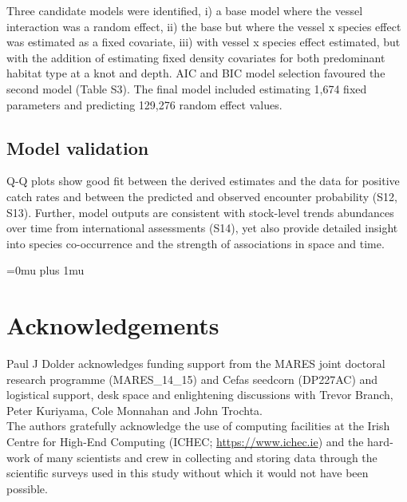 \documentclass[fleqn,10pt]{wlscirep}
\begin{document}
\begin{linenumbers}
Three candidate models were identified, i) a base model where the vessel
interaction was a random effect, ii) the base but where the vessel x species
effect was estimated as a fixed covariate, iii) with vessel x species effect
estimated, but with the addition of estimating fixed density covariates for
both predominant habitat type at a knot and depth. AIC and BIC model selection
favoured the second model (Table S3). The final model included estimating 1,674
fixed parameters and predicting 129,276 random effect values.\\

\subsection*{Model validation\\}

Q-Q plots show good fit between the derived estimates and the data for positive
catch rates and between the predicted and observed encounter probability (S12,
S13).  Further, model outputs are consistent with stock-level trends abundances
over time from international assessments (S14), yet also provide detailed
insight into species co-occurrence and the strength of associations in space
and time. \\

\end{linenumbers}
\newpage
\Urlmuskip=0mu plus 1mu\relax
%



\newpage



\section*{Acknowledgements} 
Paul J Dolder acknowledges funding support from the MARES joint doctoral
research programme (MARES\_14\_15) and Cefas seedcorn (DP227AC) and logistical
support, desk space and enlightening discussions with Trevor Branch, Peter
Kuriyama, Cole Monnahan and John Trochta.\\
	 
The authors gratefully acknowledge the use of computing facilities at the Irish
Centre for High-End Computing (ICHEC; \url{https://www.ichec.ie}) and the
hard-work of many scientists and crew in collecting and storing data through
the scientific surveys used in this study without which it would not have been
possible.  \\
\end{document}
